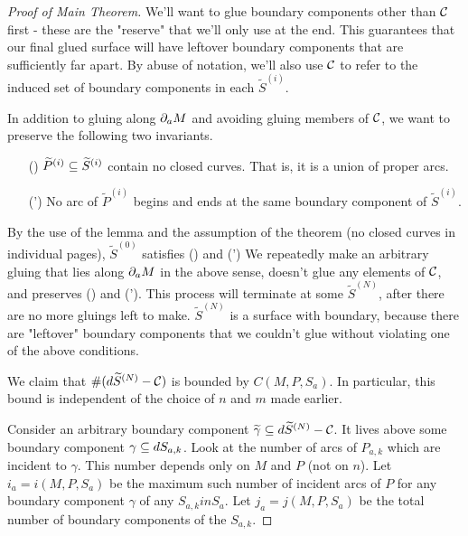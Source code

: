 \begin{proof}[Proof of Main Theorem]
We'll want to glue boundary components other than $\mathcal{C}$ first - these are the
"reserve" that we'll only use at the end. This guarantees that our final glued
surface will have leftover boundary components that are sufficiently far apart.
By abuse of notation, we'll also use $\mathcal{C}$ to refer to the induced set of
boundary components in each $\widetilde{S}^{(i)}$.

In addition to gluing along $\partial_aM$ and avoiding gluing members of $\mathcal{C}$, we want
to preserve the following two invariants.


\begin{enumerate}

\item[(\dag)] $\widetilde{P}^{(i)} \subseteq \widetilde{S}^{(i)}$ contain no closed
curves.  That is, it is a union of proper arcs. \label{I:dag}

\item[(\dag')] No arc of $\widetilde{P}^{(i)}$ begins and ends at the same
boundary component of $\widetilde{S}^{(i)}$. \label{I:dag'}

\end{enumerate}

By the use of the lemma and the assumption of the theorem (no closed curves in
individual pages), $\widetilde{S}^{(0)}$ satisfies (\dag) and (\dag') We
repeatedly make an arbitrary gluing that lies along $\partial_aM$ in the above
sense, doesn't glue any elements of $\mathcal{C}$, and preserves (\dag) and (\dag').  This
process will terminate at some $\widetilde{S}^{(N)}$, after there are no more
gluings left to make. $\widetilde{S}^{(N)}$ is a surface with boundary, because
there are "leftover" boundary components that we couldn't glue without
violating one of the above conditions.


We claim that $\#(d\widetilde{S}^{(N)} - \mathcal{C})$ is bounded by $C(M,P,S_a)$.  In
particular, this bound is independent of the choice of $n$ and $m$ made
earlier.


Consider an arbitrary boundary component $\widetilde{\gamma} \subseteq
d\widetilde{S}^{(N)} - \mathcal{C}$.  It lives above some boundary component $\gamma
\subseteq dS_{a,k}$. Look at the number of arcs of $P_{a,k}$ which are incident to
$\gamma$. This number depends only on $M$ and $P$ (not on $n$). Let $i_a
= i(M,P,S_a)$ be the maximum such number of incident arcs of $P$ for any
boundary component $\gamma$ of any $S_{a,k} in S_a$. Let $j_a = j(M,P,S_a)$ be
the total number of boundary components of the $S_{a,k}$.


\end{proof}
